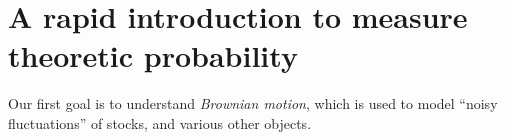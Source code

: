 
\ifstandalonechapter\setcounter{chapter}{1}\fi
\chapter{A rapid introduction to measure theoretic probability}

Our first goal is to understand \emph{Brownian motion}, which is used to model ``noisy fluctuations'' of stocks, and various other objects.

